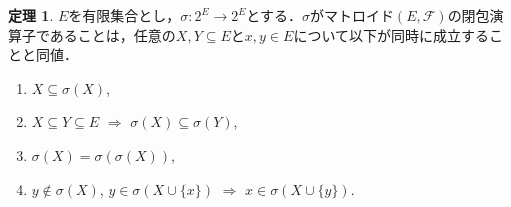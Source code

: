 \documentclass[xelatex,ja=standard,a4paper,14pt,everyparhook=compat]{bxjsarticle}
\theoremstyle{definition}
\newtheorem{theorem}{定理}[subsection]
\begin{document}
\begin{theorem}
    $E$を有限集合とし，$\sigma : 2^E \to 2^E$とする．$\sigma$がマトロイド$(E, \mathcal{F})$の閉包演算子であることは，任意の$X, Y \subseteq E$と$x, y \in E$について以下が同時に成立することと同値． \begin{enumerate}[label=(S\arabic*)]
        \item $X \subseteq \sigma(X)$,
        \item $X \subseteq Y \subseteq E$ $\Longrightarrow$ $\sigma(X) \subseteq \sigma(Y)$,
        \item $\sigma(X) = \sigma(\sigma(X))$,
        \item $y \notin \sigma(X)$, $y \in \sigma(X \cup \{x\})$ $\Longrightarrow$ $x \in \sigma(X \cup \{y\})$.
    \end{enumerate}
\end{theorem}
\end{document}
